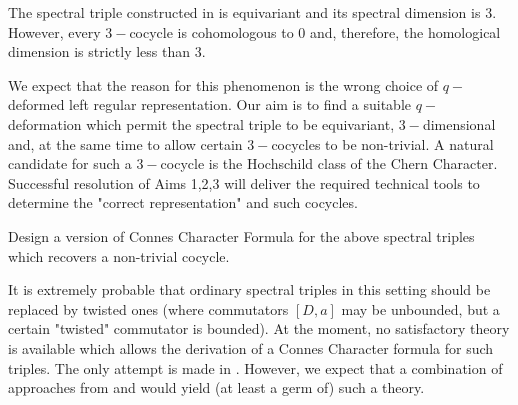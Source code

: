 \documentclass[12pt]{article}
\begin{document}
The spectral triple constructed in \cite{ChakrabortyPal} is equivariant and its spectral dimension is $3.$ However, every $3-$cocycle is cohomologous to $0$ and, therefore, the homological dimension is strictly less than $3.$ 

We expect that the reason for this phenomenon is the wrong choice of $q-$deformed left regular representation. Our aim is to find a suitable $q-$deformation which permit the spectral triple to be equivariant, $3-$dimensional and, at the same time to allow certain $3-$cocycles to be non-trivial. A natural candidate for such a $3-$cocycle is the Hochschild class of the Chern Character. Successful resolution of Aims 1,2,3 will deliver the required technical tools to determine the "correct representation" and such cocycles.


 Design a version of Connes Character Formula for the above spectral triples which recovers a non-trivial cocycle.

It is extremely probable that ordinary spectral triples in this setting should be replaced by twisted ones (where commutators $[D,a]$ may be unbounded, but a certain "twisted" commutator is bounded). At the moment, no satisfactory theory is available which allows the derivation of a Connes Character formula for such triples. The only attempt is made in \cite{MasF}. However, we expect that a combination of approaches from \cite{MasF} and \cite{CRSZ} would yield (at least a germ of) such a theory.
\end{document}

